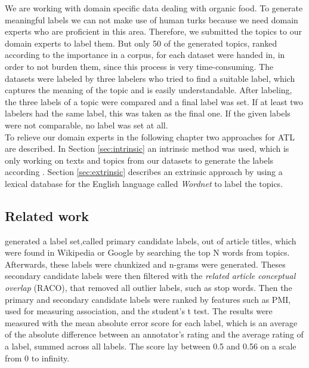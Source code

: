 We are working with domain specific data dealing with organic food. To generate meaningful labels we can not make use of human turks because we need domain experts who are proficient in this area. Therefore, we submitted the topics to our domain experts to label them. But only 50 of the generated topics, ranked according to the importance in a corpus, for each dataset were handed in, in order to not burden them, since this process is very time-consuming. The datasets were labeled by three labelers who tried to find a suitable label, which captures the meaning of the topic and is easily understandable. After labeling, the three labels of a topic were compared and a final label was set. If at least two labelers had the same label, this was taken as the final one. If the given labels were not comparable, no label was set at all. \\

To relieve our domain experts in the following chapter two approaches for \ac{ATL} are described. In Section \ref{sec:intrinsic} an intrinsic method was used, which is only working on texts and topics from our datasets to generate the labels according \cite{Mei2007}. Section \ref{sec:extrinsic} describes an extrinsic approach by using a lexical database for the English language called \textit{Wordnet} to label the topics.


\subsection{Related work}                                                
\label{sec:relWorl: atl}
\textit{\cite{Lau2011}} generated a label set,called primary candidate labels, out of article titles, which were found in Wikipedia or Google by searching the top N words from topics. Afterwards, these labels were chunkized and n-grams were generated. Theses secondary candidate labels were then filtered with the \textit{related article conceptual overlap} (RACO), that removed all outlier labels, such as stop words. Then the primary and secondary candidate labels were ranked by features such as \ac{PMI}, used for measuring association, and the student’s t test. The results were measured with the mean absolute error score for each label, which is an average of the absolute difference between an annotator’s rating and the average rating of a label, summed across all labels. The score lay between 0.5 and 0.56 on a scale from 0 to infinity.

